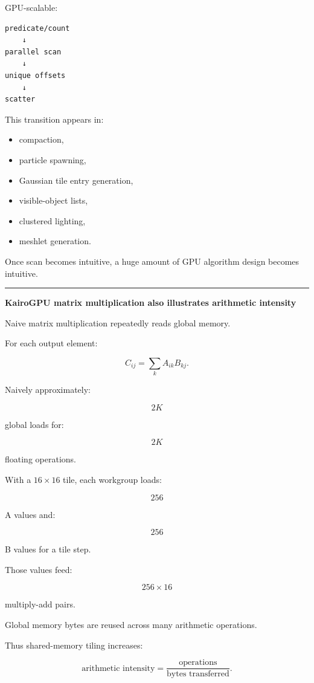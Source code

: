 GPU-scalable:

\protect{}\label{0aznm5}%
\begin{verbatim}
predicate/count
    ↓
parallel scan
    ↓
unique offsets
    ↓
scatter
\end{verbatim}

This transition appears in:

\begin{itemize}
\tightlist
\item
  compaction,
\item
  particle spawning,
\item
  Gaussian tile entry generation,
\item
  visible-object lists,
\item
  clustered lighting,
\item
  meshlet generation.
\end{itemize}

Once scan becomes intuitive, a huge amount of GPU algorithm design becomes intuitive.

\begin{center}\rule{0.5\linewidth}{0.5pt}\end{center}

\textbf{KairoGPU matrix multiplication also illustrates arithmetic intensity}

Naive matrix multiplication repeatedly reads global memory.

For each output element:

\[
C_{ij}
=
\sum_k A_{ik}B_{kj}.
\]

Naively approximately:

\[
2K
\]

global loads for:

\[
2K
\]

floating operations.

With a \(16\times16\) tile, each workgroup loads:

\[
256
\]

A values and:

\[
256
\]

B values for a tile step.

Those values feed:

\[
256\times16
\]

multiply-add pairs.

Global memory bytes are reused across many arithmetic operations.

Thus shared-memory tiling increases:

\[
\boxed{
\text{arithmetic intensity}
=
\frac{
\text{operations}
}{
\text{bytes transferred}
}.
}
\]

